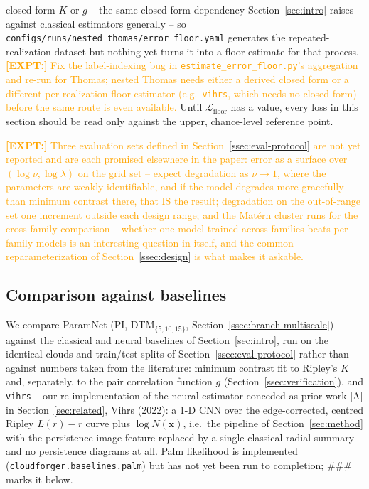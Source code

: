 \documentclass[11pt,letterpaper]{article}
\newcommand{\1}{\mathds{1}}
\newcommand{\pc}{\mathbf{x}}
\newcommand{\expt}[1]{\textcolor{orange}{\textbf{[EXPT:] }#1}}
\theoremstyle{plain}
\theoremstyle{definitioncolon}
\begin{document}
closed-form $K$ or $g$ -- the same closed-form dependency
Section~\ref{sec:intro} raises against classical estimators generally -- so
\texttt{configs/runs/nested\_thomas/error\_floor.yaml} generates the
repeated-realization dataset but nothing yet turns it into a floor estimate
for that process. \expt{Fix the label-indexing bug in \texttt{estimate\_error\_floor.py}'s
aggregation and re-run for Thomas; nested Thomas needs either a derived closed
form or a different per-realization floor estimator (e.g.\ \texttt{vihrs}, which
needs no closed form) before the same route is even available.} Until
$\mathcal{L}_{\text{floor}}$ has a value, every loss in this section should
be read only against the upper, chance-level reference point.

\expt{Three evaluation sets defined in Section~\ref{ssec:eval-protocol} are not
yet reported and are each promised elsewhere in the paper: error as a surface
over $(\log\nu, \log\lambda)$ on the grid set -- expect degradation as
$\nu \to 1$, where the parameters are weakly identifiable, and if the model
degrades more gracefully than minimum contrast there, that IS the result;
degradation on the out-of-range set one increment outside each design range;
and the Mat\'ern cluster runs for the cross-family comparison -- whether one
model trained across families beats per-family models is an interesting question
in itself, and the common reparameterization of Section~\ref{ssec:design} is
what makes it askable.}

\subsection{Comparison against baselines}
\label{ssec:exp-baselines}

We compare ParamNet (PI, DTM$_{\{5,10,15\}}$, Section~\ref{ssec:branch-multiscale})
against the classical and neural baselines of Section~\ref{sec:intro}, run on
the identical clouds and train/test splits of Section~\ref{ssec:eval-protocol}
rather than against numbers taken from the literature: minimum contrast fit to
Ripley's $K$ and, separately, to the pair correlation function $g$
(Section~\ref{ssec:verification}), and \texttt{vihrs} -- our re-implementation
of the neural estimator conceded as prior work [A] in Section~\ref{sec:related},
Vihrs (2022): a 1-D CNN over the edge-corrected, centred Ripley $L(r)-r$ curve
plus $\log N(\pc)$, i.e.\ the pipeline of Section~\ref{sec:method} with the
persistence-image feature replaced by a single classical radial summary and no
persistence diagrams at all. Palm likelihood \citep{tanaka2008parameter} is
implemented (\texttt{cloudforger.baselines.palm}) but has not yet been run to
completion; \#\#\# marks it below.
\end{document}
